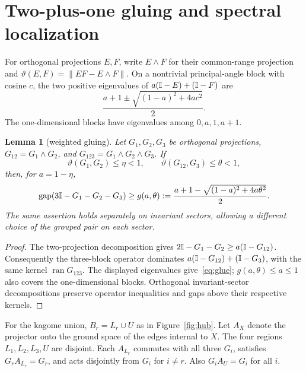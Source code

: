 \documentclass[11pt,a4paper]{article}
\newtheorem{lemma}[theorem]{Lemma}\newtheorem{proposition}[theorem]{Proposition}
\theoremstyle{remark}\newtheorem{remark}[theorem]{Remark}
\newcommand{\gap}{\operatorname{gap}}\newcommand{\ran}{\operatorname{ran}}
\begin{document}
\section{Two-plus-one gluing and spectral localization}\label{sec:gluing}
For orthogonal projections $E,F$, write $E\wedge F$ for their common-range projection and $\vartheta(E,F)=\|EF-E\wedge F\|$. On a nontrivial principal-angle block with cosine $c$, the two positive eigenvalues of $a(\mathbb I-E)+(\mathbb I-F)$ are
\[
 \frac{a+1\pm\sqrt{(1-a)^2+4ac^2}}2.
\]
The one-dimensional blocks have eigenvalues among $0,a,1,a+1$.
\begin{lemma}[weighted gluing]\label{lem:glue}
Let $G_1,G_2,G_3$ be orthogonal projections, $G_{12}=G_1\wedge G_2$, and $G_{123}=G_1\wedge G_2\wedge G_3$. If
\[
 \vartheta(G_1,G_2)\le\eta<1,\qquad
 \vartheta(G_{12},G_3)\le\theta<1,
\]
then, for $a=1-\eta$,
\begin{equation}\label{eq:glue}
 \gap(3\id-G_1-G_2-G_3)\ge
 g(a,\theta):=\frac{a+1-\sqrt{(1-a)^2+4a\theta^2}}2.
\end{equation}
The same assertion holds separately on invariant sectors, allowing a different choice of the grouped pair on each sector.
\end{lemma}
\begin{proof}
The two-projection decomposition gives $2\mathbb I-G_1-G_2\ge a(\mathbb I-G_{12})$. Consequently the three-block operator dominates $a(\mathbb I-G_{12})+(\mathbb I-G_3)$, with the same kernel $\ran G_{123}$. The displayed eigenvalues give~\eqref{eq:glue}; $g(a,\theta)\le a\le1$ also covers the one-dimensional blocks. Orthogonal invariant-sector decompositions preserve operator inequalities and gaps above their respective kernels.
\end{proof}

For the kagome union, $B_r=L_r\cup U$ as in Figure~\ref{fig:hub}. Let $A_X$ denote the projector onto the ground space of the edges internal to $X$. The four regions $L_1,L_2,L_3,U$ are disjoint. Each $A_{L_r}$ commutes with all three $G_i$, satisfies $G_rA_{L_r}=G_r$, and acts disjointly from $G_i$ for $i\ne r$. Also $G_iA_U=G_i$ for all $i$.
\end{document}
